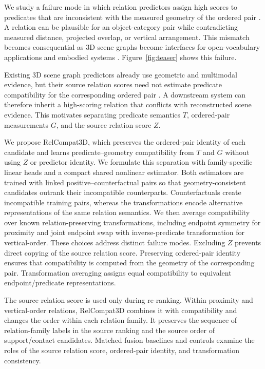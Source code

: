 We study a failure mode in which relation predictors assign high scores to predicates that are inconsistent with the measured geometry of the ordered pair \cite{nguyen2026relwitness,neau2026visual}. A relation can be plausible for an object-category pair while contradicting measured distance, projected overlap, or vertical arrangement. This mismatch becomes consequential as 3D scene graphs become interfaces for open-vocabulary applications and embodied systems \cite{koch2024open3dsg,hou2025fross,zhang2025open,wang2025open,saxena2025zing,fei2026open,madhavaram2026vizor}. Figure~\ref{fig:teaser} shows this failure.

Existing 3D scene graph predictors already use geometric and multimodal evidence, but their source relation scores need not estimate predicate compatibility for the corresponding ordered pair \cite{wald2020learning,zhang2021exploiting,feng20233d,wang2023vl,koch2024sgrec3d,chen2024clip}. A downstream system can therefore inherit a high-scoring relation that conflicts with reconstructed scene evidence. This motivates separating predicate semantics $T$, ordered-pair measurements $G$, and the source relation score $Z$.

We propose RelCompat3D, which preserves the ordered-pair identity of each candidate and learns predicate--geometry compatibility from $T$ and $G$ without using $Z$ or predictor identity. We formulate this separation with family-specific linear heads and a compact shared nonlinear estimator. Both estimators are trained with linked positive--counterfactual pairs so that geometry-consistent candidates outrank their incompatible counterparts. Counterfactuals create incompatible training pairs, whereas the transformations encode alternative representations of the same relation semantics. We then average compatibility over known relation-preserving transformations, including endpoint symmetry for proximity and joint endpoint swap with inverse-predicate transformation for vertical-order. These choices address distinct failure modes. Excluding $Z$ prevents direct copying of the source relation score. Preserving ordered-pair identity ensures that compatibility is computed from the geometry of the corresponding pair. Transformation averaging assigns equal compatibility to equivalent endpoint/predicate representations. 

The source relation score is used only during re-ranking. Within proximity and vertical-order relations, RelCompat3D combines it with compatibility and changes the order within each relation family. It preserves the sequence of relation-family labels in the source ranking and the source order of support/contact candidates. Matched fusion baselines and controls examine the roles of the source relation score, ordered-pair identity, and transformation consistency. 

